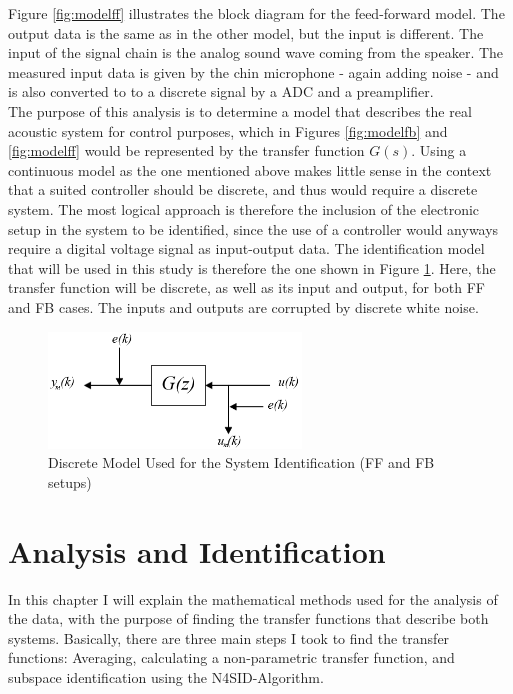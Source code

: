 Figure \ref{fig:modelff} illustrates the block diagram for the feed-forward model. The output data is the same as in the other model, but the input is different. The input of the signal chain is the analog sound wave coming from the speaker. The measured input data is given by the chin microphone - again adding noise - and is also converted to to a discrete signal by a ADC and a preamplifier.\\

The purpose of this analysis is to determine a model that describes the real acoustic system for control purposes, which in Figures \ref{fig:modelfb} and \ref{fig:modelff} would be represented by the transfer function $G(s)$. Using a continuous model as the one mentioned above makes little sense in the context that a suited controller should be discrete, and thus would require a discrete system. The most logical approach is therefore the inclusion of the electronic setup in the system to be identified, since the use of a controller would anyways require a digital voltage signal as input-output data. The identification model that will be used in this study is therefore the one shown in Figure \ref{fig:modeldiscrete}. Here, the transfer function will be discrete, as well as its input and output, for both FF and FB cases. The inputs and outputs are corrupted by discrete white noise.

\begin{figure}[h]
\centering
\includegraphics[width=0.6\textwidth]{pics/discrete_model}
\caption{Discrete Model Used for the System Identification (FF and FB setups)}
\label{fig:modeldiscrete}
\end{figure}



\chapter{Analysis and Identification}\label{chap: analysisandid}

In this chapter I will explain the mathematical methods used for the analysis of the data, with the purpose of finding the transfer functions that describe both systems. Basically, there are three main steps I took to find the transfer functions: Averaging, calculating a non-parametric transfer function, and subspace identification using the N4SID-Algorithm.\\

